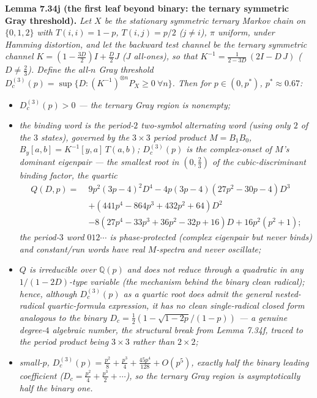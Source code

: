 \documentclass[
]{article}
\begin{document}
\textbf{Lemma 7.34j (the first leaf beyond binary: the ternary symmetric Gray
threshold).} \emph{Let $X$ be the stationary symmetric ternary Markov chain on
$\{0,1,2\}$ with $T(i,i)=1-p$, $T(i,j)=p/2$ ($j\ne i$), $\pi$ uniform, under
Hamming distortion, and let the backward test channel be the ternary symmetric
channel $K=(1-\tfrac{3D}2)I+\tfrac D2 J$ ($J$ all-ones), so that
$K^{-1}=\tfrac1{2-3D}\,(2I-D\,J)$ ($D\ne\tfrac23$). Define the all-$n$ Gray
threshold $D_c^{(3)}(p)=\sup\{D:(K^{-1})^{\otimes n}P_X\ge0\ \forall n\}$. Then
for $p\in(0,p^*)$, $p^*\approx0.67$:}
\begin{itemize}
\item[(i)] \emph{$D_c^{(3)}(p)>0$ --- the ternary Gray region is nonempty;}
\item[(ii)] \emph{the binding word is the period-$2$ two-symbol \emph{alternating}
word (using only $2$ of the $3$ states), governed by the $3\times3$ period
product $M=B_1B_0$, $B_y[a,b]=K^{-1}[y,a]\,T(a,b)$; $D_c^{(3)}(p)$ is the
complex-onset of $M$'s dominant eigenpair --- the smallest root in $(0,\tfrac23)$
of the cubic-discriminant binding factor, the quartic}
\[\begin{aligned}
  Q(D,p)=\;&9p^2(3p-4)^2D^4-4p(3p-4)(27p^2-30p-4)D^3\\
  &+(441p^4-864p^3+432p^2+64)D^2\\
  &-8(27p^4-33p^3+36p^2-32p+16)D+16p^2(p^2+1);
\end{aligned}\]
\emph{the period-$3$ word $012\cdots$ is phase-protected (complex eigenpair but
never binds) and constant/run words have real $M$-spectra and never oscillate;}
\item[(iii)] \emph{$Q$ is \emph{irreducible} over $\mathbb Q(p)$ and does not
reduce through a quadratic in any $1/(1-2D)$-type variable (the mechanism behind
the binary clean radical); hence, although $D_c^{(3)}(p)$ as a quartic root does
admit the general nested-radical quartic-formula expression, it has \emph{no
clean single-radical closed form} analogous to the binary
$D_c=\tfrac12(1-\sqrt{1-2p}/(1-p))$ --- a genuine degree-$4$ algebraic number,
the structural break from Lemma 7.34f, traced to the period product being
$3\times3$ rather than $2\times2$;}
\item[(iv)] \emph{small-$p$, $D_c^{(3)}(p)=\tfrac{p^2}8+\tfrac{p^3}4
+\tfrac{45p^4}{128}+O(p^5)$, exactly \emph{half} the binary leading coefficient
($D_c=\tfrac{p^2}4+\tfrac{p^3}2+\cdots$), so the ternary Gray region is
asymptotically half the binary one.}
\end{itemize}
\end{document}
